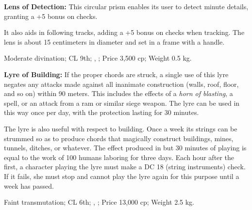 \textbf{Lens of Detection:} This circular prism enables its user to detect minute details, granting a +5 bonus on  checks.

It also aids in following tracks, adding a +5 bonus on  checks when tracking. The lens is about 15 centimeters in diameter and set in a frame with a handle.

Moderate divination; CL 9th; , ; Price 3,500 cp; Weight 0.5 kg.



\textbf{Lyre of Building:} If the proper chords are struck, a single use of this lyre negates any attacks made against all inanimate construction (walls, roof, floor, and so on) within 90 meters. This includes the effects of a \emph{horn of blasting}, a  spell, or an attack from a ram or similar siege weapon. The lyre can be used in this way once per day, with the protection lasting for 30 minutes.

The lyre is also useful with respect to building. Once a week its strings can be strummed so as to produce chords that magically construct buildings, mines, tunnels, ditches, or whatever. The effect produced in but 30 minutes of playing is equal to the work of 100 humans laboring for three days. Each hour after the first, a character playing the lyre must make a DC 18  (string instruments) check. If it fails, she must stop and cannot play the lyre again for this purpose until a week has passed.

Faint transmutation; CL 6th; , ; Price 13,000 cp; Weight 2.5 kg.







